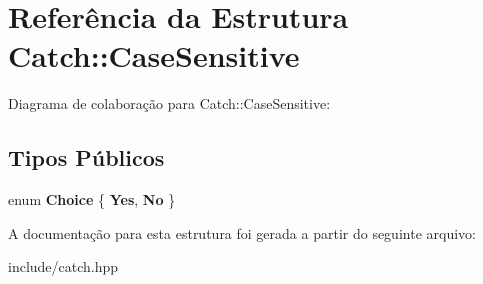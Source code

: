\hypertarget{structCatch_1_1CaseSensitive}{}\section{Referência da Estrutura Catch\+:\+:Case\+Sensitive}
\label{structCatch_1_1CaseSensitive}


Diagrama de colaboração para Catch\+:\+:Case\+Sensitive\+:
\subsection*{Tipos Públicos}
\begin{DoxyCompactItemize}
\item 
enum {\bfseries Choice} \{ {\bfseries Yes}, 
{\bfseries No}
 \}\hypertarget{structCatch_1_1CaseSensitive_aad49d3aee2d97066642fffa919685c6a}{}\label{structCatch_1_1CaseSensitive_aad49d3aee2d97066642fffa919685c6a}

\end{DoxyCompactItemize}


A documentação para esta estrutura foi gerada a partir do seguinte arquivo\+:\begin{DoxyCompactItemize}
\item 
include/catch.\+hpp\end{DoxyCompactItemize}
